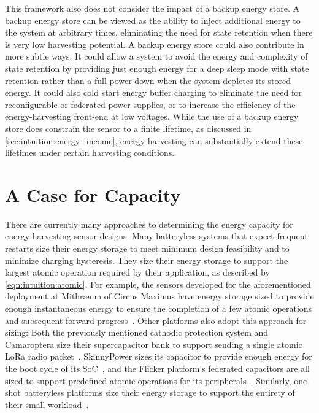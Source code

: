This framework also does not consider the impact of a backup energy store.
A backup energy store can be viewed as the ability to inject additional energy
to the system at arbitrary times,
eliminating the need for state retention when there is very low
harvesting potential.
A backup energy store could also contribute in more subtle ways. It could
allow a system to avoid the energy and complexity of state retention by
providing just enough energy for a deep sleep mode with state retention rather
than a full power down when the system depletes its stored energy. It could also
cold start energy buffer charging to eliminate the need for reconfigurable
or federated power supplies, or to increase the efficiency of
the energy-harvesting front-end at low voltages.
While the use of a backup energy store
does constrain the sensor to a finite lifetime,
as discussed in \cref{sec:intuition:energy_income}, energy-harvesting can substantially extend these lifetimes under certain harvesting
conditions.

\section{A Case for Capacity}
\label{sec:intuition:capacity}
There are currently many approaches to determining the energy capacity for energy harvesting sensor designs. 
Many batteryless systems that expect frequent restarts size their energy storage to meet minimum design feasibility and to minimize charging hysteresis.
They size their energy storage to support the largest atomic operation required by their application, as described by 
\cref{eqn:intuition:atomic}. 
For example, the sensors developed for the aforementioned deployment at Mithræum of Circus Maximus have energy storage sized to provide enough instantaneous energy to ensure the completion of a few atomic operations and subsequent forward progress~\cite{afanasov2020battery}. Other platforms also adopt this approach for sizing: Both the previously mentioned cathodic protection system and Camaroptera size their supercapacitor bank to support sending a single atomic LoRa radio packet~\cite{nardello2019camaroptera,jagtap2021repurposing},  SkinnyPower sizes its capacitor to provide enough energy for the boot cycle of its SoC~\cite{shukla2019skinnypower}, and the Flicker platform's federated capacitors are all sized to support predefined atomic operations for its peripherals~\cite{hesterFlicker17}.
Similarly, one-shot batteryless platforms size their energy storage to support the entirety of their small workload~\cite{yervaGrafting12,debruin2013monjolo,campbellEnergy14,campbellThermes14}.

